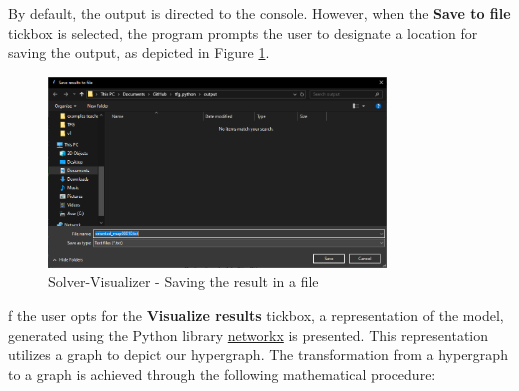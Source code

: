 By default, the output is directed to the console. However, when the \textbf{Save to file} tickbox is selected, the program prompts the user to designate a location for saving the output, as depicted in Figure \ref{fig:save-as}.

\begin{figure}[H]
    \centering
    \includegraphics[width=0.8\textwidth]{Design of the User Interface/save-as.png}
    \caption{Solver-Visualizer - Saving the result in a file}
    \label{fig:save-as}
\end{figure}

f the user opts for the \textbf{Visualize results} tickbox, a representation of the model, generated using the Python library \href{https://networkx.org/}{networkx} is presented. This representation utilizes a graph to depict our hypergraph. The transformation from a hypergraph to a graph is achieved through the following mathematical procedure:

